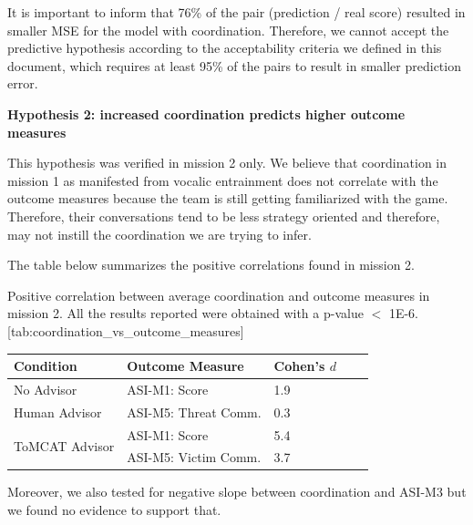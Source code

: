 It is important to inform that 76\% of the pair (prediction / real score)
resulted in smaller MSE for the model with coordination. Therefore, we cannot
accept the predictive hypothesis according to the acceptability criteria we
defined in this document, which requires at least 95\% of the pairs to result
in smaller prediction error.

\textbf{Hypothesis 2: increased coordination predicts higher outcome measures}

This hypothesis was verified in mission 2 only. We believe that coordination in
mission 1 as manifested from vocalic entrainment does not correlate with the
outcome measures because the team is still getting familiarized with the game.
Therefore, their conversations tend to be less strategy oriented and therefore,
may not instill the coordination we are trying to infer.

The table below summarizes the positive correlations found in mission 2.

\begin{table}[h]
	\centering
    \begin{sidecaption}{%
        Positive correlation between average coordination and outcome measures
        in mission 2. All the results reported were obtained with a p-value $<$
        1E-6.
    }[tab:coordination_vs_outcome_measures]
	\begin{tabular}{lllll}
		\toprule
		\textbf{Condition} & \textbf{Outcome Measure} & \textbf{Cohen's $d$}\\
		\midrule
		No Advisor                      & ASI-M1: Score        & 1.9\\
		Human Advisor                   & ASI-M5: Threat Comm. & 0.3\\
		\multirow{2}{*}{ToMCAT Advisor} & ASI-M1: Score        & 5.4\\
				                        & ASI-M5: Victim Comm. & 3.7\\
		\bottomrule
	\end{tabular}
\end{sidecaption}
\end{table}

Moreover, we also tested for negative slope between coordination and ASI-M3 but
we found no evidence to support that.

